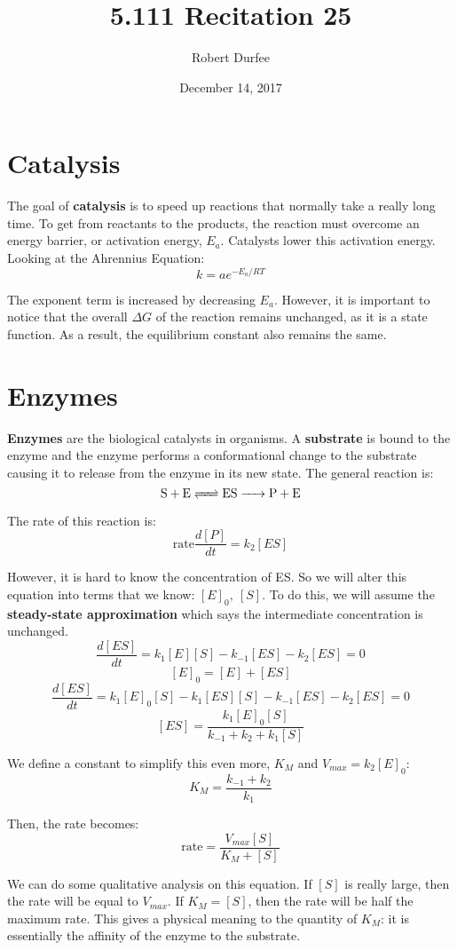 \documentclass{article}
\title{ 5.111 Recitation 25 }
\author{ Robert Durfee }
\date{ December 14, 2017 }
\begin{document}
\maketitle

\section{ Catalysis }

The goal of \textbf{catalysis} is to speed up reactions that normally take a
really long time. To get from reactants to the products, the reaction must
overcome an energy barrier, or activation energy, $E_{a}$. Catalysts lower this
activation energy. Looking at the Ahrennius Equation:
$$ k = a e^{-E_{a} / RT} $$

The exponent term is increased by decreasing $E_{a}$. However, it is important
to notice that the overall $\Delta G$ of the reaction remains unchanged, as it
is a state function. As a result, the equilibrium constant also remains the
same.

\section{Enzymes}

\textbf{Enzymes} are the biological catalysts in organisms. A \textbf{substrate}
is bound to the enzyme and the enzyme performs a conformational change to the
substrate causing it to release from the enzyme in its new state. The general
reaction is:
$$ \ce{ S + E <=> ES -> P + E } $$

The rate of this reaction is:
$$ \mathrm{rate} \frac{ d[P] }{ dt } = k_{2}[ES] $$

However, it is hard to know the concentration of ES. So we will alter this
equation into terms that we know: $[E]_{0},\ [S]$. To do this, we will assume
the \textbf{steady-state approximation} which says the intermediate
concentration is unchanged.
$$ \frac{ d[ES] }{ dt } = k_{1}[E][S] - k_{-1}[ES] - k_{2}[ES] = 0 $$
$$ [E]_{0} = [E] + [ES] $$
$$ \frac{ d[ES] }{ dt } = k_{1}[E]_{0}[S] - k_{1}[ ES ][ S ] -k_{-1}[ES] -
k_{2}[ES] = 0 $$
$$ [ES] = \frac{ k_{1}[E]_{0}[S] }{ k_{-1} + k_{2} + k_{1}[S] } $$

We define a constant to simplify this even more, $K_{M}$ and $V_{max}=k_{2}[ E
]_{0}$:
$$ K_{M} = \frac{ k_{-1} + k_{2} }{ k_{1} }$$

Then, the rate becomes:
$$ \mathrm{rate} = \frac{ V_{max}[S] }{ K_{M} + [S] } $$

We can do some qualitative analysis on this equation. If $[S]$ is really large,
then the rate will be equal to $V_{max}$. If $K_{M} = [S]$, then the rate will
be half the maximum rate. This gives a physical meaning to the quantity of
$K_{M}$: it is essentially the affinity of the enzyme to the substrate.
\end{document}
